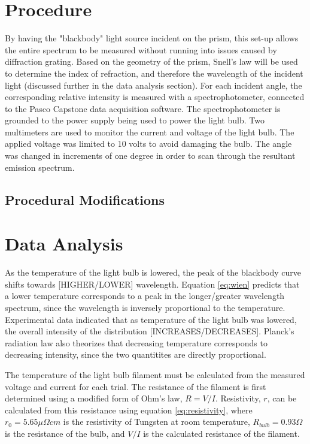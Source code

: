 \documentclass[a4paper]{article}
\begin{document}
\section{Procedure}

\qq By having the "blackbody" light source incident on the prism, this set-up allows the entire spectrum to be measured without running into issues caused by diffraction grating. Based on the geometry of the prism, Snell's law will be used to determine the index of refraction, and therefore the wavelength of the incident light (discussed further in the data analysis section). For each incident angle, the corresponding relative intensity is measured with a spectrophotometer, connected to the Pasco Capstone data acquisition software. The spectrophotometer is grounded to the power supply being used to power the light bulb. Two multimeters are used to monitor the current and voltage of the light bulb. The applied voltage was limited to 10 volts to avoid damaging the bulb. The angle was changed in increments of one degree in order to scan through the resultant emission spectrum.

\subsection{Procedural Modifications}
\qq 

\section{Data Analysis}

\qq As the temperature of the light bulb is lowered, the peak of the blackbody curve shifts towards [HIGHER/LOWER] wavelength. Equation \ref{eq:wien} predicts that a lower temperature corresponds to a peak in the longer/greater wavelength spectrum, since the wavelength is inversely proportional to the temperature. Experimental data indicated that as temperature of the light bulb was lowered, the overall intensity of the distribution [INCREASES/DECREASES]. Planck's radiation law also theorizes that decreasing temperature corresponds to decreasing intensity, since the two quantitites are directly proportional.

\qq The temperature of the light bulb filament must be calculated from the measured voltage and current for each trial. The resistance of the filament is first determined using a modified form of Ohm's law, $R=V/I$. Resistivity, $r$, can be calculated from this resistance using equation \ref{eq:resistivity}, where $r_0 = 5.65 \mu \Omega cm$ is the resistivity of Tungsten at room temperature, $R_{bulb}=0.93 \Omega$ is the resistance of the bulb, and $V/I$ is the calculated resistance of the filament. 
\end{document}
